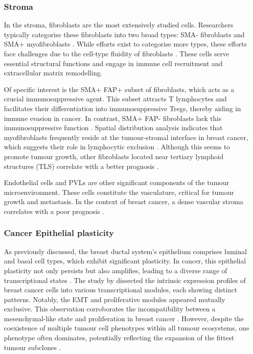 \subsubsection*{Stroma}

In the stroma, fibroblasts are the most extensively studied cells. Researchers typically categorise these fibroblasts into two broad types: SMA- fibroblasts and SMA+ myofibroblasts \parencite{Costa2018-ir}. While efforts exist to categorise more types, these efforts face challenges due to the cell-type fluidity of fibroblasts \parencite{Cords2023-og,Wu2021-uq}. These cells serve essential structural functions and engage in immune cell recruitment and extracellular matrix remodelling.

Of specific interest is the SMA+ FAP+ subset of fibroblasts, which acts as a crucial immunosuppressive agent. This subset attracts T lymphocytes and facilitates their differentiation into immunosuppressive Tregs, thereby aiding in immune evasion in cancer. In contrast, SMA+ FAP- fibroblasts lack this immunosuppressive function \parencite{Costa2018-ir}. Spatial distribution analysis indicates that myofibroblasts frequently reside at the tumour-stromal interface in breast cancer, which suggests their role in lymphocytic exclusion \parencite{Danenberg2022-zb}. Although this seems to promote tumour growth, other fibroblasts located near tertiary lymphoid structures (TLS) correlate with a better prognosis \parencite{Danenberg2022-zb, Cords2023-og}.

Endothelial cells and \acp{PVL} are other significant components of the tumour microenvironment. These cells constitute the vasculature, critical for tumour growth and metastasis. In the context of breast cancer, a dense vascular stroma correlates with a poor prognosis \parencite{Danenberg2022-zb}.

\subsubsection*{Cancer Epithelial plasticity}

As previously discussed, the breast ductal system's epithelium comprises luminal and basal cell types, which exhibit significant plasticity. In cancer, this epithelial plasticity not only persists but also amplifies, leading to a diverse range of transcriptional states \parencite{Wagner2019-zp, Wu2021-uq, Pal2021-rf}. The study by \textcite{Wu2021-uq} dissected the intrinsic expression profiles of breast cancer cells into various transcriptional modules, each showing distinct patterns. Notably, the \acf{EMT} and proliferative modules appeared mutually exclusive. This observation corroborates the incompatibility between a mesenchymal-like state and proliferation in breast cancer \parencite{Tsai2012-hb}. However, despite the coexistence of multiple tumour cell phenotypes within all tumour ecosystems, one phenotype often dominates, potentially reflecting the expansion of the fittest tumour subclones \parencite{Wagner2019-zp}.

